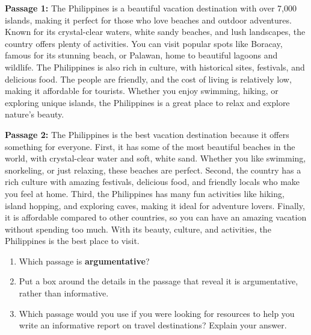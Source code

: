 \documentclass[12pt]{article}
\begin{document}
\begin{tcolorbox}[colframe=black!60, colback=white, 
coltitle=black, colbacktitle=black!15, fonttitle=\bfseries\Large, 
title=Text: Traveling to the Philippines, halign title=center, left=10pt, right=10pt, top=10pt, bottom=15pt]
 
\textbf{Passage 1:} The Philippines is a beautiful vacation destination with over 7,000 islands, making it perfect for those who love beaches and outdoor adventures. Known for its crystal-clear waters, white sandy beaches, and lush landscapes, the country offers plenty of activities. You can visit popular spots like Boracay, famous for its stunning beach, or Palawan, home to beautiful lagoons and wildlife. The Philippines is also rich in culture, with historical sites, festivals, and delicious food. The people are friendly, and the cost of living is relatively low, making it affordable for tourists. Whether you enjoy swimming, hiking, or exploring unique islands, the Philippines is a great place to relax and explore nature’s beauty. 

\vspace{1em}
\textbf{Passage 2: } The Philippines is the best vacation destination because it offers something for everyone. First, it has some of the most beautiful beaches in the world, with crystal-clear water and soft, white sand. Whether you like swimming, snorkeling, or just relaxing, these beaches are perfect. Second, the country has a rich culture with amazing festivals, delicious food, and friendly locals who make you feel at home. Third, the Philippines has many fun activities like hiking, island hopping, and exploring caves, making it ideal for adventure lovers. Finally, it is affordable compared to other countries, so you can have an amazing vacation without spending too much. With its beauty, culture, and activities, the Philippines is the best place to visit.

 
\end{tcolorbox}

\vspace{1em}

\begin{tcolorbox}[colframe=black!60, colback=white, 
coltitle=black, colbacktitle=black!15, fonttitle=\bfseries\Large, 
title=Guided Practice, halign title=center, left=10pt, right=10pt, top=10pt, bottom=15pt]

\begin{enumerate}[itemsep=1em]
    \item Which passage is \textbf{argumentative}? 
\vspace{0.5cm}
    \item Put a box around the details in the passage that reveal it is argumentative, rather than informative.

    \item Which passage would you use if you were looking for resources to help you write an informative report on travel destinations? Explain your answer.
\vspace{5em}
\end{enumerate}
\end{tcolorbox}
\end{document}
